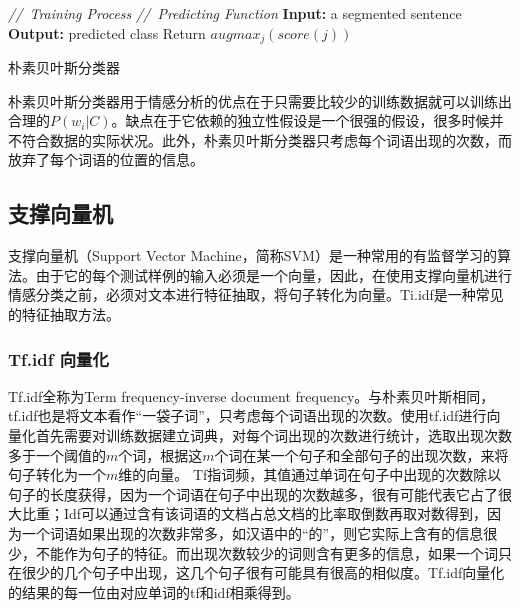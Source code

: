 \begin{algorithm}

\emph{//\ Training Process}\;
\BlankLine
\emph{//\ Predicting Function}\;
\textbf{Input:} a segmented sentence\;
\textbf{Output:} predicted class\;
Return $augmax_{j}(score(j))$
\caption{朴素贝叶斯分类器}\label{Naive Bayes}
\label{alog:algorithm2}
\end{algorithm}\DecMargin{1em}

朴素贝叶斯分类器用于情感分析的优点在于只需要比较少的训练数据就可以训练出合理的$P(w_i|C)$。缺点在于它依赖的独立性假设是一个很强的假设，很多时候并不符合数据的实际状况。此外，朴素贝叶斯分类器只考虑每个词语出现的次数，而放弃了每个词语的位置的信息。
\subsection{支撑向量机}
支撑向量机（Support Vector Machine，简称SVM）是一种常用的有监督学习的算法。由于它的每个测试样例的输入必须是一个向量，因此，在使用支撑向量机进行情感分类之前，必须对文本进行特征抽取，将句子转化为向量。Ti.idf是一种常见的特征抽取方法。
\subsubsection{Tf.idf 向量化}
Tf.idf全称为Term frequency-inverse document frequency。与朴素贝叶斯相同，tf.idf也是将文本看作“一袋子词”，只考虑每个词语出现的次数。使用tf.idf进行向量化首先需要对训练数据建立词典，对每个词出现的次数进行统计，选取出现次数多于一个阈值的$m$个词，根据这$m$个词在某一个句子和全部句子的出现次数，来将句子转化为一个$m$维的向量。
Tf指词频，其值通过单词在句子中出现的次数除以句子的长度获得，因为一个词语在句子中出现的次数越多，很有可能代表它占了很大比重；Idf可以通过含有该词语的文档占总文档的比率取倒数再取对数得到，因为一个词语如果出现的次数非常多，如汉语中的“的”，则它实际上含有的信息很少，不能作为句子的特征。而出现次数较少的词则含有更多的信息，如果一个词只在很少的几个句子中出现，这几个句子很有可能具有很高的相似度。Tf.idf向量化的结果的每一位由对应单词的tf和idf相乘得到。

